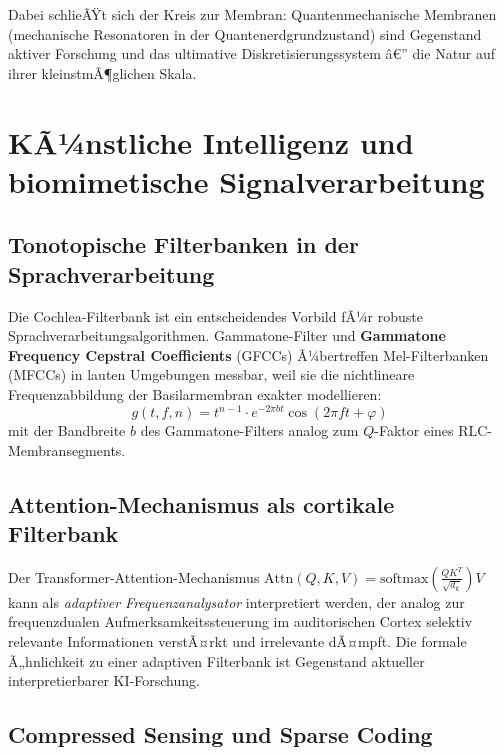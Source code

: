 ﻿\documentclass[12pt,a4paper,titlepage]{report}
\begin{document}
Dabei schlieÃŸt sich der Kreis zur Membran: Quantenmechanische Membranen
(mechanische Resonatoren in der Quantenerdgrundzustand) sind Gegenstand aktiver
Forschung und das ultimative Diskretisierungssystem â€” die Natur auf ihrer
kleinstmÃ¶glichen Skala.

\section{KÃ¼nstliche Intelligenz und biomimetische Signalverarbeitung}

\subsection{Tonotopische Filterbanken in der Sprachverarbeitung}

Die Cochlea-Filterbank ist ein entscheidendes Vorbild fÃ¼r robuste
Sprachverarbeitungsalgorithmen. Gammatone-Filter und \textbf{Gammatone Frequency
Cepstral Coefficients} (GFCCs) Ã¼bertreffen Mel-Filterbanken (MFCCs) in lauten
Umgebungen messbar, weil sie die nichtlineare Frequenzabbildung der Basilarmembran
exakter modellieren:
\[
    g(t, f, n) = t^{n-1} \cdot e^{-2\pi bt} \cos(2\pi f t + \varphi)
\]
mit der Bandbreite $b$ des Gammatone-Filters analog zum $Q$-Faktor eines
RLC-Membran\-segments.

\subsection{Attention-Mechanismus als cortikale Filterbank}

Der Transformer-Attention-Mechanismus $\mathrm{Attn}(Q,K,V) = \mathrm{softmax}\!\left(\frac{QK^T}{\sqrt{d_k}}\right)V$
kann als \emph{adaptiver Frequenzanalysator} interpretiert werden, der analog
zur frequenzdualen Aufmerksamkeitssteuerung im auditorischen Cortex selektiv
relevante Informationen verstÃ¤rkt und irrelevante dÃ¤mpft. Die formale Ã„hnlichkeit
zu einer adaptiven Filterbank ist Gegenstand aktueller interpretierbarer KI-Forschung.

\subsection{Compressed Sensing und Sparse Coding}
\end{document}
